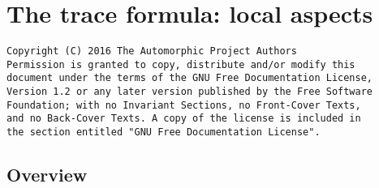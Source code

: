 \documentclass[oneside]{stacks-project-book}
\theoremstyle{plain}
\theoremstyle{definition}
\theoremstyle{remark}
\numberwithin{equation}{subsection}
\begin{document}
%

\chapter{The trace formula: local aspects}



\label{traceformulalocal-section-phantom}
\hypertarget{0600}{}
\reversemarginpar{}

\begin{verbatim}
Copyright (C) 2016 The Automorphic Project Authors
Permission is granted to copy, distribute and/or modify this
document under the terms of the GNU Free Documentation License,
Version 1.2 or any later version published by the Free Software
Foundation; with no Invariant Sections, no Front-Cover Texts,
and no Back-Cover Texts. A copy of the license is included in
the section entitled "GNU Free Documentation License".
\end{verbatim}



\section{Overview}
\label{traceformulalocal-section-overview}
\hypertarget{0601}{}
\reversemarginpar{}

\noindent
\end{document}
